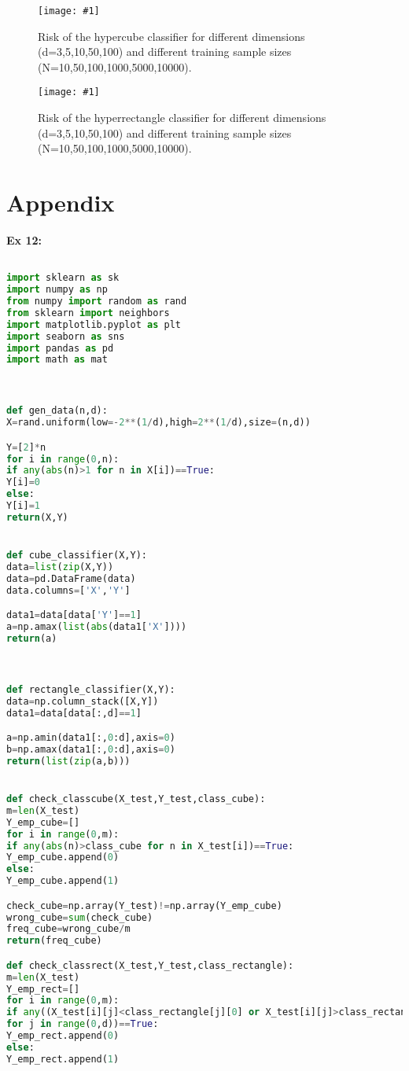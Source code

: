 \documentclass[11pt, english]{article}
\newcommand{\grafico}[5]{
	\begin{figure}
		[h!tbp]
		\centering
		\texttt{[image: \#1]}
		\caption{#4\label{#5}}
	\end{figure}
}
\begin{document}
\grafico{graphics/cube_class.png}{0.4}{0}{Risk of the hypercube classifier for different dimensions (d=3,5,10,50,100) and different training sample sizes (N=10,50,100,1000,5000,10000).}{cube}
\grafico{graphics/rect_class.png}{0.4}{0}{Risk of the hyperrectangle classifier for different dimensions (d=3,5,10,50,100) and different training sample sizes (N=10,50,100,1000,5000,10000).}{rect}




\newpage

\section*{Appendix}

\textbf{Ex 12:}

\begin{lstlisting}[language=Python]

import sklearn as sk
import numpy as np
from numpy import random as rand
from sklearn import neighbors
import matplotlib.pyplot as plt
import seaborn as sns
import pandas as pd
import math as mat



def gen_data(n,d):
X=rand.uniform(low=-2**(1/d),high=2**(1/d),size=(n,d))

Y=[2]*n
for i in range(0,n):
if any(abs(n)>1 for n in X[i])==True:
Y[i]=0
else:
Y[i]=1
return(X,Y)


def cube_classifier(X,Y):
data=list(zip(X,Y))
data=pd.DataFrame(data)
data.columns=['X','Y']

data1=data[data['Y']==1]
a=np.amax(list(abs(data1['X'])))
return(a)



def rectangle_classifier(X,Y):
data=np.column_stack([X,Y])
data1=data[data[:,d]==1]

a=np.amin(data1[:,0:d],axis=0)
b=np.amax(data1[:,0:d],axis=0)
return(list(zip(a,b)))


def check_classcube(X_test,Y_test,class_cube):
m=len(X_test)    
Y_emp_cube=[]
for i in range(0,m):
if any(abs(n)>class_cube for n in X_test[i])==True:
Y_emp_cube.append(0)
else:
Y_emp_cube.append(1)

check_cube=np.array(Y_test)!=np.array(Y_emp_cube)
wrong_cube=sum(check_cube)
freq_cube=wrong_cube/m
return(freq_cube)

def check_classrect(X_test,Y_test,class_rectangle):    
m=len(X_test)  
Y_emp_rect=[]
for i in range(0,m):
if any((X_test[i][j]<class_rectangle[j][0] or X_test[i][j]>class_rectangle[j][1]) 
for j in range(0,d))==True:
Y_emp_rect.append(0)
else:
Y_emp_rect.append(1)


\end{lstlisting}
\end{document}
